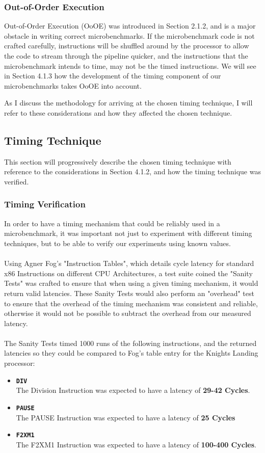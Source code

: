 \documentclass[bsc,frontabs,twoside,singlespacing,parskip,deptreport]{infthesis}     %
\begin{document}
\subsubsection{Out-of-Order Execution}
Out-of-Order Execution (OoOE) was introduced in Section 2.1.2, and is a major obstacle in writing correct microbenchmarks. If the microbenchmark code is not crafted carefully, instructions will be shuffled around by the processor to allow the code to stream through the pipeline quicker, and the instructions that the microbenchmark intends to time, may not be the timed instructions. We will see in Section 4.1.3 how the development of the timing component of our microbenchmarks takes OoOE into account.

As I discuss the methodology for arriving at the chosen timing technique, I will refer to these considerations and how they affected the chosen technique.

\subsection{Timing Technique}
This section will progressively describe the chosen timing technique with reference to the considerations in Section 4.1.2, and how the timing technique was verified.

\subsubsection{Timing Verification}
In order to have a timing mechanism that could be reliably used in a microbenchmark, it was important not just to experiment with different timing techniques, but to be able to verify our experiments using known values. \\
\\
Using Agner Fog's "Instruction Tables"\cite{inst_tables}, which details cycle latency for standard x86 Instructions on different CPU Architectures, a test suite coined the "Sanity Tests" was crafted to ensure that when using a given timing mechanism, it would return valid latencies. These Sanity Tests would also perform an "overhead" test to ensure that the overhead of the timing mechanism was consistent and reliable, otherwise it would not be possible to subtract the overhead from our measured latency. \\
\\
The Sanity Tests timed 1000 runs of the following instructions, and the returned latencies so they could be compared to Fog's table entry for the Knights Landing processor:
\begin{itemize}
    \item{{\bf \texttt{DIV}} \\
        The Division Instruction was expected to have a latency of \textbf{29-42 Cycles}.
    }
    \item{{\bf \texttt{PAUSE}} \\
        The PAUSE Instruction was expected to have a latency of \textbf{25 Cycles}
    }
    \item{{\bf \texttt{F2XM1}} \\
        The F2XM1 Instruction was expected to have a latency of \textbf{100-400 Cycles}.
    }
\end{itemize}
\end{document}
